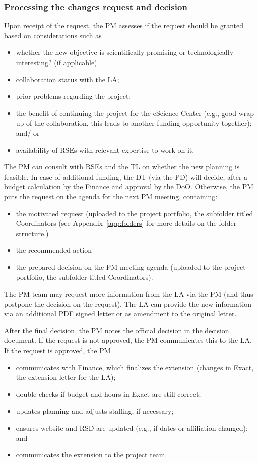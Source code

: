 \subsubsection{Processing the changes request and decision}
Upon receipt of the request, the PM assesses if the request should be granted based on considerations such as 
\begin{itemize}
\item whether the new objective is scientifically promising or technologically interesting? (if applicable)
\item collaboration status with the LA;
\item prior problems regarding the project;
\item the benefit of continuing the project for the eScience Center (e.g., good wrap up of the collaboration, this leads to
another funding opportunity together); and/ or
\item availability of RSEs with relevant expertise to work on it.
\end{itemize}

The PM can consult with RSEs and the TL on whether the new planning is feasible. In case of additional funding, the DT
(via the PD) will decide, after a budget calculation by the Finance and approval by the DoO. Otherwise, the PM puts the
request on the agenda for the next PM meeting, containing: 
\begin{itemize}
\item the motivated request (uploaded to the project portfolio, the subfolder titled Coordinators (see Appendix~\ref{app:folders} for more details on the folder structure.)
\item the recommended action
\item the prepared decision on the PM meeting agenda (uploaded to the project portfolio, the subfolder titled Coordinators).
\end{itemize}

The PM team may request more information from the LA via the PM (and thus postpone the decision on the request). The LA
can provide the new information via an additional PDF signed letter or as amendment to the original letter.

After the final decision, the PM notes the official decision in the decision document. If the request is not approved,
the PM communicates this to the LA. If the request is approved, the PM
\begin{itemize}
\item communicates with Finance, which finalizes the extension (changes in Exact, the extension letter for the LA);
\item double checks if budget and hours in Exact are still correct;
\item updates planning and adjusts staffing, if necessary;
\item ensures website and RSD are updated (e.g., if dates or affiliation changed); and
\item communicates the extension to the project team.
\end{itemize}


